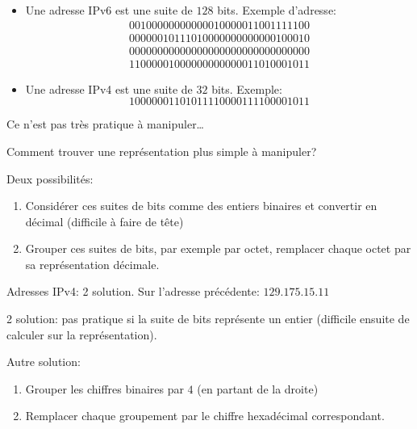 \begin{itemize}
\item Une adresse IPv6 est une suite de $128$ bits. Exemple d'adresse:
  \begin{equation*}
    \begin{array}{r}
  0010 0000 0000 0001 %
  0000 0110 0111 1100\\ %
  0000 0010 1110 1000 %
  0000 0000 0010 0010\\ %
  0000 0000 0000 0000 %
  0000 0000 0000 0000\\ %
  1100 0001 0000 0000 %
  0000 0110 1000 1011 %
    \end{array}
  \end{equation*}
\item Une adresse IPv4 est une suite de $32$ bits. Exemple:
  \begin{equation*}
  1000 0001 %
  1010 1111 %
  0000 1111 %
  0000 1011 %
  \end{equation*}
\end{itemize}

Ce n'est pas très pratique à manipuler\ldots{}

Comment trouver une représentation plus simple à manipuler?

Deux possibilités:

\begin{enumerate}
\item Considérer ces suites de bits comme des entiers binaires et
  convertir en décimal (difficile à faire de tête)
\item Grouper ces suites de bits, par exemple par octet, remplacer
  chaque octet par sa représentation décimale.
\end{enumerate}

Adresses IPv4: 2 solution. Sur l'adresse précédente:
$129.175.15.11$

2  solution: pas  pratique si  la  suite de  bits représente  un
entier (difficile ensuite de calculer sur la représentation).

Autre solution:
\begin{enumerate}
\item Grouper les chiffres binaires par $4$ (en partant de la droite)
\item Remplacer chaque groupement par le chiffre hexadécimal
  correspondant.
\end{enumerate}

